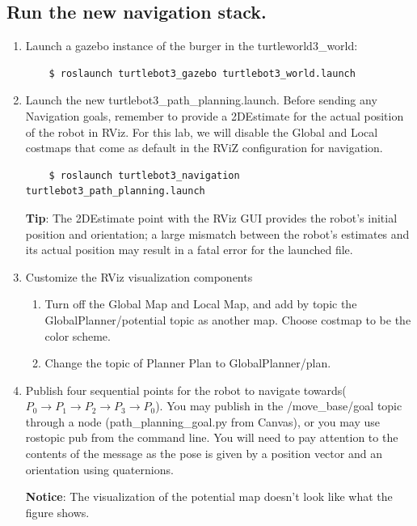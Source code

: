 \documentclass[12pt]{article}
\begin{document}
    \subsection{Run the new navigation stack.}
    \begin{enumerate}
    \item Launch a gazebo instance of the burger in the turtleworld3\_world:
    
     \begin{verbatim}
    $ roslaunch turtlebot3_gazebo turtlebot3_world.launch
    \end{verbatim}
    
    \item Launch the new turtlebot3\_path\_planning.launch. Before sending any Navigation goals, remember to provide a 2DEstimate for the actual position of the robot in RViz. For this lab, we will disable the Global and Local costmaps that come as default in the RViZ configuration for navigation.
     \begin{verbatim}
    $ roslaunch turtlebot3_navigation turtlebot3_path_planning.launch
    \end{verbatim}

    \textbf{Tip}: The 2DEstimate point with the RViz GUI provides the robot’s initial position and orientation; a large mismatch between the robot’s estimates and its actual position may result in a fatal error for the launched file.

    \item Customize the RViz visualization components
    \begin{enumerate}
        \item Turn off the Global Map and Local Map, and add by topic the GlobalPlanner/potential topic as another map. Choose costmap to be the color scheme.
        \item Change the topic of Planner Plan to GlobalPlanner/plan.
    \end{enumerate}
    
    \item Publish four sequential points for the robot to navigate towards($P_0 \rightarrow P_1\rightarrow P_2 \rightarrow P_3 \rightarrow P_0$). You may publish in the /move\_base/goal topic through a node (path\_planning\_goal.py from Canvas), or you may use rostopic pub from the command line. You will need to pay attention to the contents of the message as the pose is given by a position vector and an orientation using quaternions.

    \textbf{Notice}: The visualization of the potential map doesn't look like what the figure shows.
    

\end{enumerate}
\end{document}
